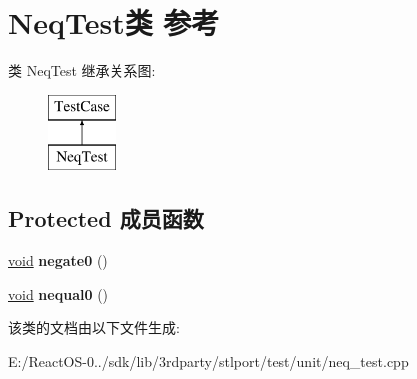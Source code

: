 \hypertarget{class_neq_test}{}\section{Neq\+Test类 参考}
\label{class_neq_test}
类 Neq\+Test 继承关系图\+:\begin{figure}[H]
\begin{center}
\leavevmode
\includegraphics[height=2.000000cm]{class_neq_test}
\end{center}
\end{figure}
\subsection*{Protected 成员函数}
\begin{DoxyCompactItemize}
\item 
\mbox{\label{class_neq_test_a8c160f44205ec33c07980a19a2e18a4b}} 
\hyperlink{interfacevoid}{void} {\bfseries negate0} ()
\item 
\mbox{\label{class_neq_test_ac19d36b4e4f53f618207c5a2b3820d99}} 
\hyperlink{interfacevoid}{void} {\bfseries nequal0} ()
\end{DoxyCompactItemize}


该类的文档由以下文件生成\+:\begin{DoxyCompactItemize}
\item 
E\+:/\+React\+O\+S-\/0../sdk/lib/3rdparty/stlport/test/unit/neq\+\_\+test.\+cpp\end{DoxyCompactItemize}
